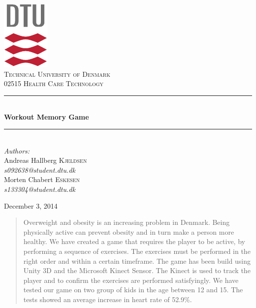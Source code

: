 \documentclass[11pt]{report}
\newcommand{\HRule}{\rule{\linewidth}{0.5mm}}
\begin{document}
\begin{titlepage}
\begin{center}

\includegraphics[scale=2.0]{../GFX/dtu_logo.pdf}\\[1cm]

\textsc{\LARGE Technical University of Denmark}\\[1.5cm]

\textsc{\Large 02515 Health Care Technology}\\[0.5cm]


\HRule \\[0.4cm]
{\huge \bfseries Workout Memory Game}\\[0.1cm]
\HRule \\[1.5cm]

\large
\emph{Authors:}
\\[10pt]
Andreas Hallberg \textsc{Kjeldsen}\\
\emph{s092638@student.dtu.dk}
\\[10pt]
Morten Chabert \textsc{Eskesen}\\
\emph{s133304@student.dtu.dk}

\vfill

{\large December 3, 2014}

\end{center}
\end{titlepage}

\begin{abstract}
Overweight and obesity is an increasing problem in Denmark. Being physically active can prevent obesity and in turn make a person more healthy. We have created a game that requires the player to be active, by performing a sequence of exercises. The exercises must be performed in the right order and within a certain timeframe. The game has been build using Unity 3D and the Microsoft Kinect Sensor. The Kinect is used to track the player and to confirm the exercises are performed satisfyingly. We have tested our game on two group of kids in the age between 12 and 15. The tests showed an average increase in heart rate of 52.9\%.
\end{abstract}
\end{document}
